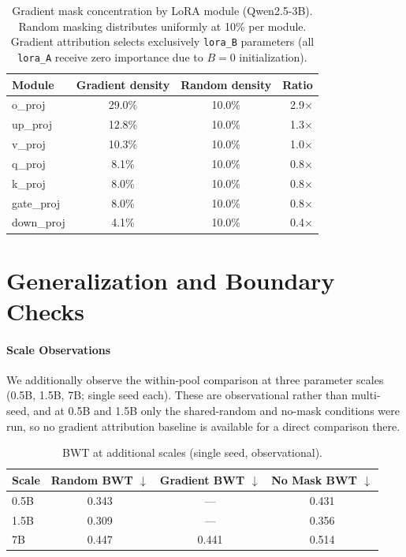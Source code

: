 \begin{table}[t]
\caption{Gradient mask concentration by LoRA module (Qwen2.5-3B). Random masking distributes uniformly at 10\% per module. Gradient attribution selects exclusively \texttt{lora\_B} parameters (all \texttt{lora\_A} receive zero importance due to $B=0$ initialization).}
\label{tab:mask_concentration}
\centering
\small
\begin{tabular}{@{}lccr@{}}
\toprule
\textbf{Module} & \textbf{Gradient density} & \textbf{Random density} & \textbf{Ratio} \\
\midrule
o\_proj & 29.0\% & 10.0\% & 2.9$\times$ \\
up\_proj & 12.8\% & 10.0\% & 1.3$\times$ \\
v\_proj & 10.3\% & 10.0\% & 1.0$\times$ \\
q\_proj & 8.1\% & 10.0\% & 0.8$\times$ \\
k\_proj & 8.0\% & 10.0\% & 0.8$\times$ \\
gate\_proj & 8.0\% & 10.0\% & 0.8$\times$ \\
down\_proj & 4.1\% & 10.0\% & 0.4$\times$ \\
\bottomrule
\end{tabular}
\end{table}


\section{Generalization and Boundary Checks}
\paragraph{Scale Observations}
\label{app:scale}

We additionally observe the within-pool comparison at three parameter scales (0.5B, 1.5B, 7B; single seed each). These are observational rather than multi-seed, and at 0.5B and 1.5B only the shared-random and no-mask conditions were run, so no gradient attribution baseline is available for a direct comparison there.

\begin{table}[ht]
\caption{BWT at additional scales (single seed, observational).}
\label{tab:scale_obs}
\centering
\small
\begin{tabular}{@{}lccc@{}}
\toprule
\textbf{Scale} & \textbf{Random BWT $\downarrow$} & \textbf{Gradient BWT $\downarrow$} & \textbf{No Mask BWT $\downarrow$} \\
\midrule
0.5B & 0.343 & --- & 0.431 \\
1.5B & 0.309 & --- & 0.356 \\
7B & 0.447 & 0.441 & 0.514 \\
\bottomrule
\end{tabular}
\end{table}


